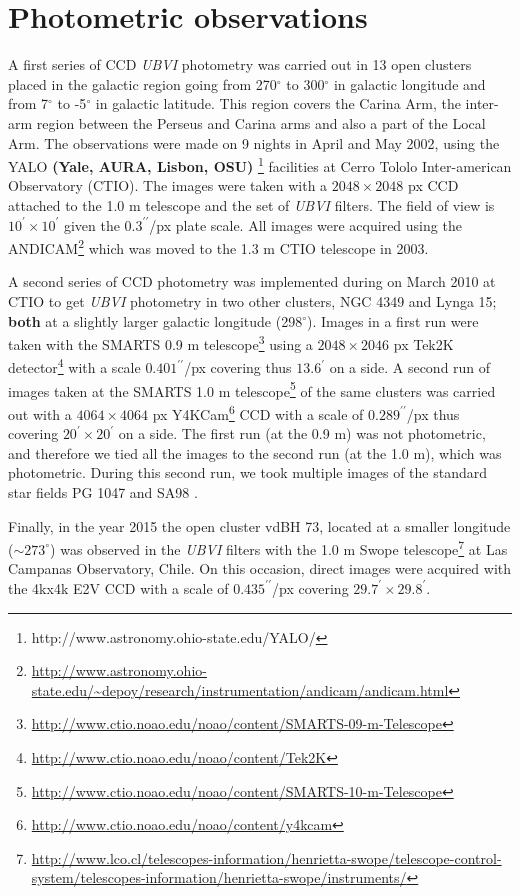\documentclass[referee]{aa}
\begin{document}
\section{Photometric observations}
\label{sec:photo_obs}

A first series of CCD \emph{UBVI} photometry was carried out in 13 open clusters
placed in the galactic region going from 270$^\circ$ to 300$^\circ$ in galactic
longitude and from 7$^\circ$ to -5$^\circ$ in galactic latitude. This region
covers the Carina Arm, the inter-arm region between the Perseus and Carina arms
and also a part of the Local Arm.
%
The observations were made on 9 nights in April and May 2002, using the YALO
\textbf{(Yale, AURA, Lisbon, OSU)}
\footnote{http://www.astronomy.ohio-state.edu/YALO/}
facilities at Cerro Tololo Inter-american
Observatory (CTIO). The images were taken with a $2048\times2048$ px CCD
attached to the 1.0 m telescope and the set of \textit{UBVI} filters.
The field of view is $10^\prime\times10^\prime$ given the
$0.3^{\prime\prime}$/px plate scale. All images were acquired using the
ANDICAM\footnote{\url{http://www.astronomy.ohio-state.edu/~depoy/research/instrumentation/andicam/andicam.html}}
which was moved to the 1.3 m CTIO telescope in 2003.

A second series of CCD photometry was implemented during on March 2010 at CTIO
to get \textit{UBVI} photometry in two other clusters,
NGC 4349 and Lynga 15; \textbf{both} at a slightly larger galactic longitude 
(298$^\circ$). Images in a first run were taken with the
SMARTS 0.9 m telescope\footnote{
\url{http://www.ctio.noao.edu/noao/content/SMARTS-09-m-Telescope}}
using a $2048\times2046$ px Tek2K
detector\footnote{\url{http://www.ctio.noao.edu/noao/content/Tek2K}} with a
scale $0.401^{\prime\prime}$/px covering thus $13.6^{\prime}$ on a side. A
second run of images taken at the SMARTS 1.0 m telescope\footnote{
\url{http://www.ctio.noao.edu/noao/content/SMARTS-10-m-Telescope}}
of the same clusters was carried out with a $4064\times4064$ px
Y4KCam\footnote{\url{http://www.ctio.noao.edu/noao/content/y4kcam}}
CCD with a scale of $0.289^{\prime\prime}$/px thus covering
$20^\prime\times20^\prime$ on a side.
%
The first run (at the 0.9 m) was not photometric, and therefore we tied all
the images to the second run (at the 1.0 m), which was photometric. During
this second run, we took multiple images of the standard star fields PG 1047
and SA98 \citep{1992AJ....104..340L}.

Finally, in the year 2015 the open cluster vdBH 73, located at a smaller
longitude ($\sim 273^\circ$) was observed in the \textit{UBVI} filters with the
1.0 m Swope telescope\footnote{\url{http://www.lco.cl/telescopes-information/henrietta-swope/telescope-control-system/telescopes-information/henrietta-swope/instruments/}}
at Las Campanas Observatory, Chile. On this occasion,
direct images were acquired with the 4kx4k E2V CCD with a scale of
$0.435^{\prime\prime}$/px covering $29.7^\prime\times29.8^\prime$.\\
\end{document}
